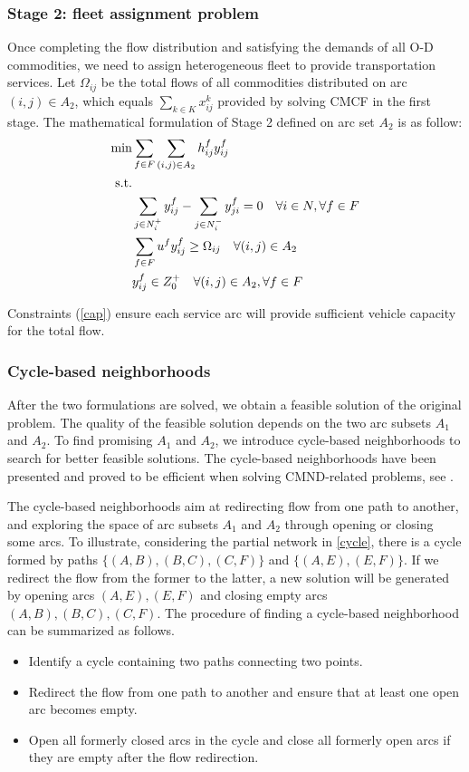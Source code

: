 \documentclass[11pt,nonblindrev,fleqn]{article}
\begin{document}
\subsubsection{Stage 2: fleet assignment problem}
Once completing the flow distribution and satisfying the demands of all O-D commodities, we need to assign heterogeneous fleet to provide transportation services. Let $\Omega_{ij}$ be the total flows of all commodities distributed on arc $(i,j) \in A_2$, which equals $\sum_{k\in K}x_{ij}^k$ provided by solving CMCF in the first stage. The mathematical formulation of Stage 2 defined on arc set $A_2$ is as follow:
\begin{align}
  \min & \sum_{f\in F}\sum_{(i,j)\in A_2} h_{ij}^f y_{ij}^f \\
    \rm{s.t.} & \nonumber \\
     & \sum_{j\in N_i^+}y_{ij}^f - \sum_{j\in N_i^-}y_{ji}^f = 0     \quad      \forall i\in N,\forall f\in F  \\
     & \sum_{f\in F} u^f y_{ij}^f \geq \Omega_{ij}      \quad       \forall (i,j)\in A_2   \label{cap} \\
     & y_{ij}^f \in Z_0^+       \quad       \forall (i,j)\in A_2, \forall f\in F
\end{align}

Constraints (\ref{cap}) ensure each service arc will provide sufficient vehicle capacity for the total flow.

\subsubsection{Cycle-based neighborhoods}
After the two formulations are solved, we obtain a feasible solution of the original problem. The quality of the feasible solution depends on the two arc subsets $A_1$ and $A_2$. To find promising $A_1$ and $A_2$, we introduce cycle-based neighborhoods to search for better feasible solutions. The cycle-based neighborhoods have been presented and proved to be efficient when solving CMND-related problems, see \cite{Ghamlouche2003Cycle, Ghamlouche2004Path,li2017design}.

The cycle-based neighborhoods aim at redirecting flow from one path to another, and exploring the space of arc subsets $A_1$ and $A_2$ through opening or closing some arcs. To illustrate, considering the partial network in \autoref{cycle}, there is a cycle formed by paths $\{ (A,B),(B,C),(C,F) \}$ and $\{ (A,E),(E,F)\}$. If we redirect the flow from the former to the latter, a new solution will be generated by opening arcs $(A,E),(E,F)$ and closing empty arcs $(A,B),(B,C),(C,F)$. The procedure of finding a cycle-based neighborhood can be summarized as follows.
\begin{itemize}
  \item Identify a cycle containing two paths connecting two points.
  \item Redirect the flow from one path to another and ensure that at least one open arc becomes empty.
  \item Open all formerly closed arcs in the cycle and close all formerly open arcs if they are empty after the flow redirection.
\end{itemize}
\end{document}

